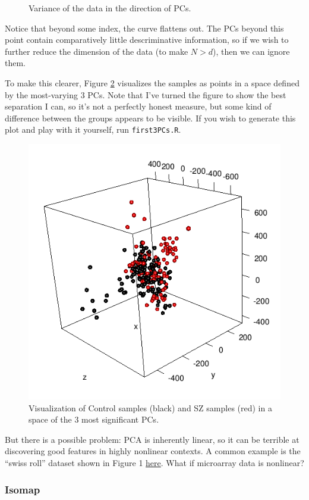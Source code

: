 \documentclass[]{article}
\begin{document}
\begin{figure}[H]
\begin{subfigure}{.49\textwidth}
    \end{subfigure}
    \caption{Variance of the data in the direction of PCs.}
    \label{fig:pcvars}
  \end{figure}

  Notice that beyond some index, the curve flattens out. The PCs beyond this point contain comparatively little descriminative information, so if we wish to further reduce the dimension of the data (to make $N > d$), then we can ignore them.

  To make this clearer, Figure \ref{fig:pc3d} visualizes the samples as points in a space defined by the most-varying 3 PCs. Note that I've turned the figure to show the best separation I can, so it's not a perfectly honest measure, but some kind of difference between the groups appears to be visible. If you wish to generate this plot and play with it yourself, run \texttt{first3PCs.R}.

  \begin{figure}[H]
    \centering
    \includegraphics[width=0.7\linewidth]{pc3d.png}
    \caption{Visualization of Control samples (black) and SZ samples (red) in a space of the 3 most significant PCs.}
    \label{fig:pc3d}
  \end{figure}

  But there is a possible problem: PCA is inherently linear, so it can be terrible at discovering good features in highly nonlinear contexts. A common example is the ``swiss roll'' dataset shown in Figure 1 \href{https://www.bioconductor.org/packages/devel/bioc/vignettes/RDRToolbox/inst/doc/vignette.pdf}{here}. What if microarray data is nonlinear?

  \subsubsection{Isomap}
\end{document}
